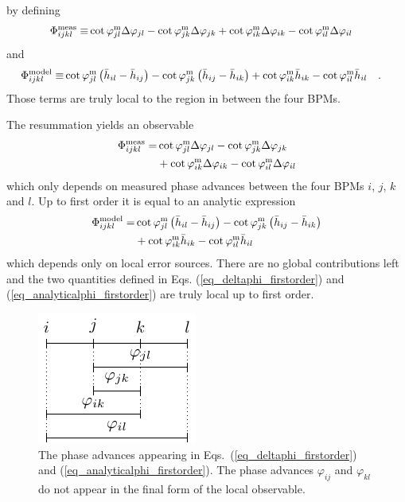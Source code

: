 %
by defining
%
\begin{align}
  \Phi^{\mathrm{meas}}_{ijkl} \equiv&
  \cot\varphi_{jl}^\text{m}\Delta\varphi_{jl} - \cot\varphi_{jk}^\text{m}\Delta\varphi_{jk}
  + \cot\varphi_{ik}^\text{m}\Delta\varphi_{ik} - \cot\varphi_{il}^\text{m}\Delta\varphi_{il} 
  \label{eq_deltaphi_firstorder_app}
\end{align}
%
and
%
\begin{align}
  \Phi_{ijkl}^\text{model} \equiv&
  \cot\varphi_{jl}^\text{m}\left(\bar{h}_{il} - \bar{h}_{ij}\right) 
  -\cot\varphi_{jk}^\text{m}\left( \bar{h}_{ij} - \bar{h}_{ik} \right)
  + \cot\varphi_{ik}^\text{m} \bar{h}_{ik} - \cot\varphi_{il}^\text{m}\bar{h}_{il}
  \quad .
  \label{eq_analyticalphi_firstorder_app}
\end{align}
%
Those terms are truly local to the region in between the four BPMs.


The resummation yields an observable
%
\begin{align}
  \Phi^{\mathrm{meas}}_{ijkl} =&
  \cot\varphi_{jl}^\text{m}\Delta\varphi_{jl} - \cot\varphi_{jk}^\text{m}\Delta\varphi_{jk} \notag \\
  &+ \cot\varphi_{ik}^\text{m}\Delta\varphi_{ik} - \cot\varphi_{il}^\text{m}\Delta\varphi_{il} 
  \label{eq_deltaphi_firstorder}
\end{align}
%
which only depends on measured phase advances between the four BPMs $i$, $j$, $k$ and $l$.
Up to first order it is equal to an analytic expression
%
\begin{align}
  \Phi_{ijkl}^\text{model} =&
  \cot\varphi_{jl}^\text{m}\left(\bar{h}_{il} - \bar{h}_{ij}\right) 
  -\cot\varphi_{jk}^\text{m}\left( \bar{h}_{ij} - \bar{h}_{ik} \right) \notag \\
  &+ \cot\varphi_{ik}^\text{m} \bar{h}_{ik} - \cot\varphi_{il}^\text{m}\bar{h}_{il}
  \label{eq_analyticalphi_firstorder}
\end{align}
%
which depends only on local error sources.
There are no global contributions left and the two quantities defined in Eqs. (\ref{eq_deltaphi_firstorder}) and 
(\ref{eq_analyticalphi_firstorder}) are truly local up to first order.
%
\begin{figure}
  \centering
  \includegraphics[width=.3\linewidth]{figThetaComb}
\caption{
  The phase advances appearing in Eqs.~(\ref{eq_deltaphi_firstorder}) and (\ref{eq_analyticalphi_firstorder}).
  The phase advances $\varphi_{ij}$ and $\varphi_{kl}$ do not appear in the final form of the local
  observable.
}
  \label{fig_thetacomb}
\end{figure}
